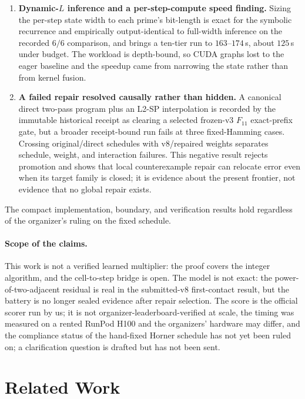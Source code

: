 \documentclass[11pt]{article}
\begin{document}
\begin{enumerate}
\item \textbf{Dynamic-$L$ inference and a per-step-compute speed finding.} Sizing the
per-step state width to each prime's bit-length is exact for the symbolic recurrence and
empirically output-identical to full-width inference on the recorded $6/6$
comparison, and brings a ten-tier run to $163$--$174$\,s, about $125$\,s under
budget. The workload is depth-bound, so CUDA graphs lost to the eager baseline and the
speedup came from narrowing the state rather than from kernel fusion.
\item \textbf{A failed repair resolved causally rather than hidden.} A canonical
direct two-pass program plus an L2-SP interpolation is recorded by the immutable
historical receipt as clearing a selected frozen-v3 $F_{11}$ exact-prefix gate,
but a broader receipt-bound run fails at three
fixed-Hamming cases. Crossing original/direct schedules with v8/repaired weights
separates schedule, weight, and interaction failures. This negative result
rejects promotion and shows that local counterexample repair can relocate error
even when its target family is closed; it is evidence about the present frontier,
not evidence that no global repair exists.
\end{enumerate}
The compact implementation, boundary, and verification results hold regardless of the organizer's
ruling on the fixed schedule.

\paragraph{Scope of the claims.}
This work is not a verified learned multiplier: the proof covers the integer
algorithm, and the cell-to-step bridge is open. The model is not exact: the
power-of-two-adjacent residual is real in the submitted-v8 first-contact result,
but the battery is no longer sealed evidence after repair selection. The score is the official scorer run by us; it is not
organizer-leaderboard-verified at scale, the timing was measured on a rented RunPod H100 and
the organizers' hardware may differ, and the compliance status of the hand-fixed
Horner schedule has not yet been ruled on; a clarification question is drafted but
has not been sent.

\section{Related Work}
\label{sec:related}
\end{document}
